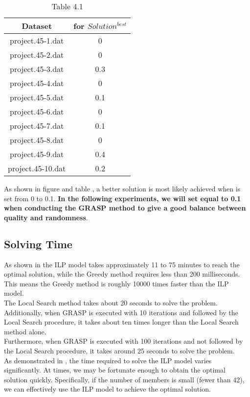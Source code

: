 \documentclass{article}
\begin{document}
\begin{table}[H]
\centering
\begin{tabular}{||c c||} 
 \hline
 Dataset & \bm{$\alpha$} for $Solution^{best}$ \\ [0.5ex] 
 \hline\hline
project.45-1.dat & 0  \\ 
project.45-2.dat & 0  \\
project.45-3.dat & 0.3  \\
project.45-4.dat & 0  \\
project.45-5.dat & 0.1  \\
project.45-6.dat & 0  \\
project.45-7.dat & 0.1  \\
project.45-8.dat & 0  \\
project.45-9.dat & 0.4  \\
project.45-10.dat & 0.2  \\ [1ex] 
 \hline
\end{tabular}
\captionsetup{labelformat=empty}
\caption{Table 4.1}
\label{table41}
\end{table}

\noindent As shown in figure  and table , a better solution is most likely achieved when \bm{$\alpha$} is set from 0 to 0.1. \textbf{In the following experiments, we will set \bm{$\alpha$} equal to 0.1 when conducting the GRASP method to give a good balance between quality and randomness}.


\subsection{Solving Time}

As shown in  the ILP model takes approximately 11 to 75 minutes to reach the optimal solution, while the Greedy method requires less than 200 milliseconds. This means the Greedy method is roughly 10000 times faster than the ILP model. \\
The Local Search method takes about 20 seconds to solve the problem.
Additionally, when GRASP is executed with 10 iterations and followed by the Local Search procedure, it takes about ten times longer than the Local Search method alone. \\
Furthermore, when GRASP is executed with 100 iterations and not followed by the Local Search procedure, it takes around 25 seconds to solve the problem.\\
As demonstrated in , the time required to solve the ILP model varies significantly. At times, we may be fortunate enough to obtain the optimal solution quickly. Specifically, if the number of members is small (fewer than 42), we can effectively use the ILP model to achieve the optimal solution.
\end{document}
